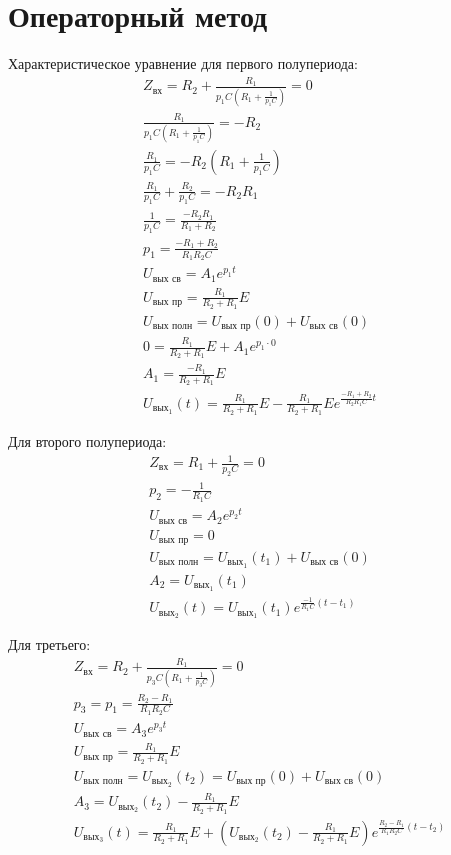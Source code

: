 \documentclass{labreport}
\begin{document}
\section{Операторный метод}
Характеристическое уравнение для первого полупериода:
\begin{gather}
    Z_\text{вх} = R_2 + \frac{R_1}{p_1C\left( R_1 + \frac{1}{p_1C} \right)} = 0 \\
    \frac{R_1}{p_1C\left( R_1 + \frac{1}{p_1C} \right)} = -R_2 \\
    \frac{R_1}{p_1C} = -R_2\left( R_1 + \frac{1}{p_1C} \right) \\
    \frac{R_1}{p_1C} + \frac{R_2}{p_1C} = -R_2R_1 \\
    \frac{1}{p_1C} = \frac{-R_2R_1}{R_1+R_2} \\ 
    p_1 = \frac{-R_1+R_2}{R_1R_2C} \\
    U_\textit{вых св} = A_1e^{p_1t} \\ 
    U_\textit{вых пр} = \frac{R_1}{R_2+R_1}E \\ 
    U_\textit{вых полн} =  U_\textit{вых пр}(0)+ U_\textit{вых св}(0) \\ 
    0 = \frac{R_1}{R_2+R_1}E+A_1e^{p_1\cdot 0} \\ 
    A_1 = \frac{-R_1}{R_2+R_1}E \\
    U_{\text{вых}_1}(t) = \frac{R_1}{R_2+R_1}E - \frac{R_1}{R_2+R_1}Ee^{\frac{-R_1+R_2}{R_2R_1C}t}
\end{gather}

Для второго полупериода:
\begin{gather}
    Z_\text{вх} = R_1 + \frac{1}{p_2C} = 0 \\
    p_2 = - \frac{1}{R_1C} \\
    U_\textit{вых св} = A_2e^{p_2t} \\ 
    U_\textit{вых пр} = 0 \\ 
    U_\textit{вых полн} =  U_{\textit{вых}_1}(t_1)+ U_\textit{вых св}(0) \\ 
    A_2 = U_{\textit{вых}_1} (t_1)\\
    U_{\textit{вых}_2}(t) = U_{\textit{вых}_1}(t_1)e^{\frac{-1}{R_1C}(t-t_1)}
\end{gather}

Для третьего:
\begin{gather}
    Z_\text{вх} = R_2 + \frac{R_1}{p_3C\left(R_1+\frac{1}{p_3C}\right)} = 0 \\
    p_3 = p_1 = \frac{R_2-R_1}{R_1R_2C} \\
    U_\textit{вых св} = A_3e^{p_3t} \\ 
    U_\textit{вых пр} = \frac{R_1}{R_2+R_1}E \\ 
    U_\textit{вых полн} =  U_{\textit{вых}_2}(t_2) =U_\textit{вых пр}(0) + U_\textit{вых св}(0) \\ 
    A_3 = U_{\textit{вых}_2} (t_2) - \frac{R_1}{R_2+R_1}E\\
    U_{\textit{вых}_3}(t) = \frac{R_1}{R_2+R_1}E + \left(U_{\textit{вых}_2}(t_2)-\frac{R_1}{R_2+R_1}E\right)e^{\frac{R_2-R_1}{R_1R_2C}(t-t_2)}
\end{gather}
\end{document}
